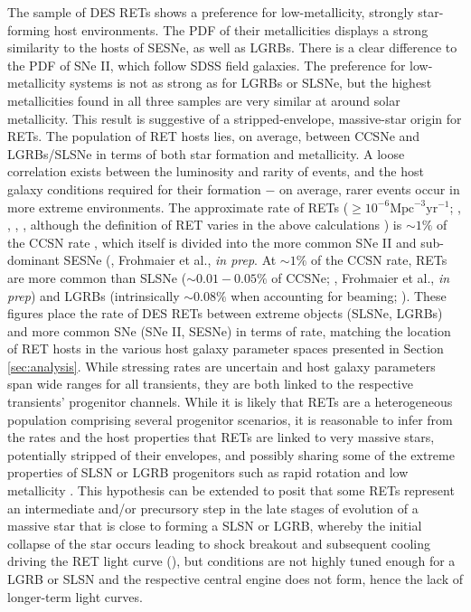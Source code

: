 \documentclass[fleqn,usenatbib,]{mnras}
\newcommand{\replyref}[1]{\color{magenta}#1 \color{black}}
\begin{document}
The sample of DES RETs shows a preference for low-metallicity, strongly star-forming host environments. The PDF of their metallicities displays a strong similarity to the hosts of SESNe, as well as LGRBs. There is a clear difference to the PDF of SNe II, which follow SDSS field galaxies. The preference for low-metallicity systems is not as strong as for LGRBs or SLSNe, but the highest metallicities found in all three samples are very similar at around solar metallicity. This result is suggestive of a stripped-envelope, massive-star origin for RETs. 
The population of RET hosts lies, on average, between CCSNe and LGRBs/SLSNe in terms of both star formation and metallicity. A loose correlation exists between the luminosity and rarity of events, and the host galaxy conditions required for their formation $-$ on average, rarer events occur in more extreme environments. The approximate rate of RETs ($\geq 10^{-6} \mathrm{Mpc}^{-3} \mathrm{yr}^{-1}$; \citealt{Drout2014}, , \citealt{Coppejans2020}, \citealt{Ho2020}, \citealt{Tampo2020} \replyref{although the definition of RET varies in the above calculations}) is $\sim1\%$ of the CCSN rate \citep{Li2011,Horiuchi2011,Strolger2015}, which itself is divided into the more common SNe II and sub-dominant SESNe (\citealt{Kelly2012}, Frohmaier et al., \textit{in prep}. At $\sim1\%$ of the CCSN rate, RETs are more common than SLSNe ($\sim0.01 - 0.05\%$ of CCSNe; \citealt{McCrum2015,Prajs2017}, Frohmaier et al., \textit{in prep}) and LGRBs (intrinsically $\sim0.08\%$ when accounting for beaming; \citealt{Graham2016}). These figures place the rate of DES RETs between extreme objects (SLSNe, LGRBs) and more common SNe (SNe II, SESNe) in terms of rate, matching the location of RET hosts in the various host galaxy parameter spaces presented in Section \ref{sec:analysis}. While stressing rates are uncertain and host galaxy parameters span wide ranges for all transients, they are both linked to the respective transients' progenitor channels. \replyref{While it is likely that RETs are a heterogeneous population comprising several progenitor scenarios, it is reasonable to infer from the rates and the host properties} that RETs are linked to very massive stars, potentially stripped of their envelopes, and possibly sharing some of the extreme properties of SLSN or LGRB \replyref{progenitors such as rapid rotation and low metallicity}. This hypothesis \replyref{can be extended to posit} that \replyref{some} RETs \replyref{represent} an intermediate and/or precursory step \replyref{in the late stages of evolution of a massive star that is close to forming a SLSN or LGRB, whereby the initial collapse of the star occurs leading to shock breakout and subsequent cooling driving the RET light curve (\citetalias{Pursiainen2018}), but conditions are not highly tuned enough for a LGRB or SLSN and the respective central engine does not form, hence the lack of longer-term light curves. }
\end{document}
